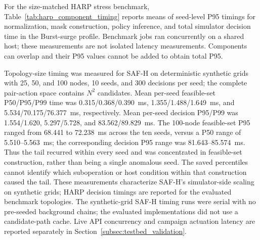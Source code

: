 \documentclass[final,5p]{elsarticle}
\newcommand{\rev}[1]{\textcolor{revisiongreen}{#1}}
\let\newrev\rev
\begin{document}
\newrev{For the size-matched HARP stress benchmark, Table~\ref{tab:harp_component_timing} reports means of seed-level P95 timings for normalization, mask construction, policy inference, and total simulator decision time in the Burst-surge profile. Benchmark jobs ran concurrently on a shared host; these measurements are not isolated latency measurements. Components can overlap and their P95 values cannot be added to obtain total P95.}
\begin{table}[t]
\centering
\caption{HARP simulator timing in synthetic Burst-surge runs (ms; mean of 20 seed-level P95 values).}
\label{tab:harp_component_timing}
\scriptsize
{}
\end{table}

\newrev{Topology-size timing was measured for SAF-H on deterministic synthetic grids with 25, 50, and 100 nodes, 10 seeds, and 300 decisions per seed; the complete pair-action space contains $N^2$ candidates. Mean per-seed feasible-set P50/P95/P99 time was 0.315/0.368/0.390~ms, 1.355/1.488/1.649~ms, and 5.534/70.175/76.377~ms, respectively. Mean per-seed decision P95/P99 was 1.554/1.620, 5.297/5.728, and 83.562/89.829~ms. The 100-node feasible-set P95 ranged from 68.441 to 72.238~ms across the ten seeds, versus a P50 range of 5.510--5.563~ms; the corresponding decision P95 range was 81.643--85.574~ms. Thus the tail recurred within every seed and was concentrated in feasible-set construction, rather than being a single anomalous seed. The saved percentiles cannot identify which suboperation or host condition within that construction caused the tail. These measurements characterize SAF-H's simulator-side scaling on synthetic grids; HARP decision timings are reported for the evaluated benchmark topologies. The synthetic-grid SAF-H timing runs were serial with no pre-seeded background chains; the evaluated implementations did not use a candidate-path cache. Live API concurrency and campaign actuation latency are reported separately in Section~\ref{subsec:testbed_validation}.}
\end{document}
